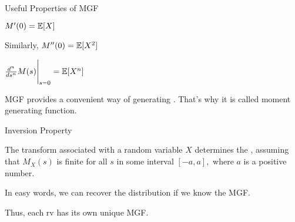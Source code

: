 \begin{frame}{Useful Properties of MGF}

\plitemsep 0.1in
\bce
\item<1-> $M'(0) = \mathbb{E}[ X ]$

\item<3-> Similarly, $M''(0) = \mathbb{E}[ X^2 ]$

\item<4-> $\frac{d^n}{ds^n} M(s) \Bigg |_{s=0} = \mathbb{E}[ X^n ]$

\item<5-> MGF provides a convenient way of generating . That's why it is called moment generating function.

\ece


\end{frame}

\begin{frame}{Inversion Property}

{
The transform  associated with a random variable $X$  determines
the , assuming that $M_X(s)$ is finite for all $s$ in some interval $[-a,a],$ where $a$ is a positive number.
}

\plitemsep 0.1in
\bci
\item In easy words, we can recover the distribution if we know the MGF.

\item Thus, each rv has its own unique MGF.

\eci


\end{frame}


